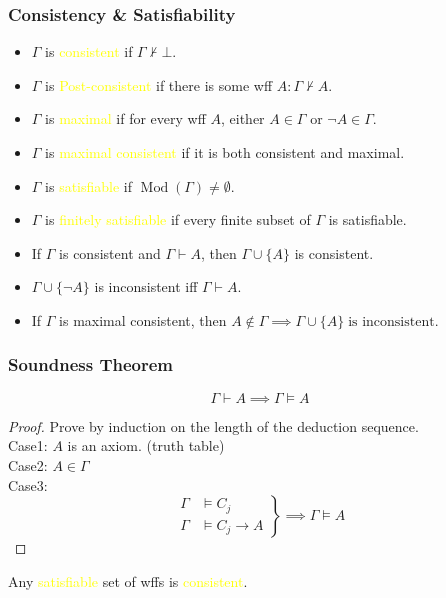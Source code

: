 \documentclass[UTF8,aspectratio=43,11pt,colorlinks,compress,openany]{beamer}%
\begin{document}
\begin{frame}\frametitle{Consistency \& Satisfiability}
	\begin{itemize}
		\item $\Gamma$ is \textcolor{yellow}{consistent} if $\Gamma\nvdash\bot$.
		\item $\Gamma$ is \textcolor{yellow}{Post-consistent} if there is some wff $A:\Gamma\nvdash A$.
		\begin{center}
		\end{center}
		\item $\Gamma$ is \textcolor{yellow}{maximal} if for every wff $A$, either $A\in\Gamma$ or $\neg A\in\Gamma$.
		\item $\Gamma$ is \textcolor{yellow}{maximal consistent} if it is both consistent and maximal.
	\end{itemize}
	\begin{itemize}
		\item $\Gamma$ is \textcolor{yellow}{satisfiable} if $\operatorname{Mod}(\Gamma)\neq\emptyset$.
		\item $\Gamma$ is \textcolor{yellow}{finitely satisfiable} if every finite subset of $\Gamma$ is satisfiable.
	\end{itemize}
	\begin{block}{}
		\begin{itemize}
			\item If $\Gamma$ is consistent and $\Gamma\vdash A$, then $\Gamma\cup\{A\}$ is consistent.
			\item $\Gamma\cup\{\neg A\}$ is inconsistent iff $\Gamma\vdash A$.
			\item {\small If $\Gamma$ is maximal consistent, then $A\notin\Gamma\implies\Gamma\cup\{A\}\;\text{is inconsistent}$.}
		\end{itemize}
	\end{block}
\end{frame}

\begin{frame}\frametitle{Soundness Theorem}
	\begin{theorem}
		\[\Gamma\vdash A\implies\Gamma\vDash A\]
	\end{theorem}
	\begin{proof}
		Prove by induction on the length of the deduction sequence.\\
		Case1: $A$ is an axiom. (truth table)\\
		Case2: $A\in\Gamma$\\
		Case3:
		\[\left.
		\begin{aligned}
		\Gamma&\vDash C_j\\
		\Gamma&\vDash C_j\to A
		\end{aligned}\right\}\implies\Gamma\vDash A\]
	\end{proof}
	\begin{corollary}
		Any \textcolor{yellow}{satisfiable} set of wffs is \textcolor{yellow}{consistent}.
	\end{corollary}
\end{frame}
\end{document}
